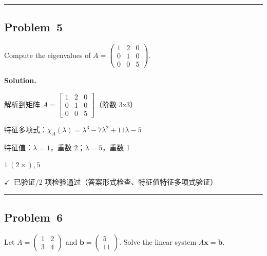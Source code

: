 \documentclass[12pt, a4paper]{article}
\newcommand{\problem}[1]{\subsection*{Problem~#1}}
\newcommand{\solution}{%
  \par\noindent
  {\color{solutiongreen}\bfseries Solution.}\par
}
\newcommand{\verifyok}{\textcolor{solutiongreen}{\ensuremath{\checkmark}\ 已验证}}
\begin{document}
\vspace{0.8em}\hrule\vspace{0.8em}

\problem{5}

\begin{stepbox}
Compute the eigenvalues of $A = \begin{pmatrix} 1 & 2 & 0 \\ 0 & 1 & 0 \\ 0 & 0 & 5 \end{pmatrix}$.
\end{stepbox}

\solution

\begin{stepbox}
解析到矩阵 $A = \left[\begin{matrix}1 & 2 & 0\\0 & 1 & 0\\0 & 0 & 5\end{matrix}\right]$（阶数 3x3）
\end{stepbox}

\begin{stepbox}
特征多项式：$\chi_A(\lambda) = \lambda^{3} - 7 \lambda^{2} + 11 \lambda - 5$
\end{stepbox}

\begin{stepbox}
特征值：$\lambda = 1$，重数 2；$\lambda = 5$，重数 1
\end{stepbox}

\begin{center}
$\boxed{1\ (2\times), 5}$
\end{center}

\begin{verifybox}\small \verifyok{}/2 项检验通过（答案形式检查、特征值特征多项式验证） \end{verifybox}

\vspace{0.8em}\hrule\vspace{0.8em}

\problem{6}

\begin{stepbox}
Let $A = \begin{pmatrix} 1 & 2 \\ 3 & 4 \end{pmatrix}$ and $\mathbf{b} = \begin{pmatrix} 5 \\ 11 \end{pmatrix}$.
Solve the linear system $A\mathbf{x} = \mathbf{b}$.
\end{stepbox}
\end{document}
